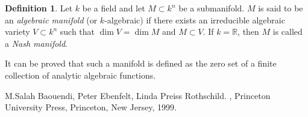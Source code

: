 \documentclass[12pt]{article}
\theoremstyle{theorem}
\theoremstyle{definition}
\newtheorem*{defn}{Definition}
\theoremstyle{remark}
\begin{document}
\begin{defn}
Let $k$ be a field and let $M \subset k^n$ be a submanifold.  $M$ is said to
be an \emph{algebraic manifold} (or $k$-algebraic) if there exists an irreducible algebraic
variety $V \subset k^n$ such that $\dim V = \dim M$ and $M \subset V$.  If $k = \mathbb{R}$,
then $M$ is called a \emph{Nash manifold}.
\end{defn}

It can be proved that such a manifold is defined as the zero set of a finite collection of analytic algebraic functions.

\begin{thebibliography}{9}
M.\@ Salah Baouendi,
Peter Ebenfelt,
Linda Preiss Rothschild.
{\em {}},
Princeton University Press,
Princeton, New Jersey, 1999.
\end{thebibliography}
\end{document}

